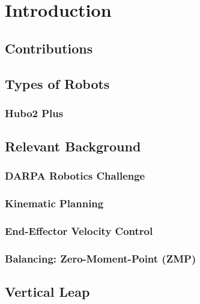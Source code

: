 \section{Introduction}
	
	\subsection{Contributions}
		
	\subsection{Types of Robots}
		
		\subsubsection{Hubo2 Plus}\label{sec:hubo}
			
	\subsection{Relevant Background}
    		
    	\subsubsection{DARPA Robotics Challenge}
    	    
		\subsubsection{Kinematic Planning}
			
		\subsubsection{End-Effector Velocity Control}
			
%			
		\subsubsection{Balancing: Zero-Moment-Point (ZMP)}
			
	\subsection{Vertical Leap}
		

%
%
%
%
%
%

%
%
%

%
%
%
